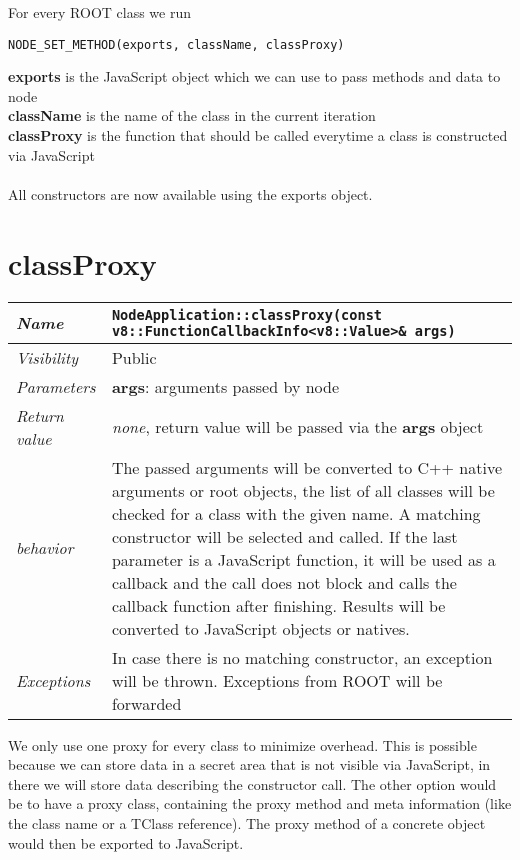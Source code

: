 For every ROOT class we run
\begin{verbatim}
NODE_SET_METHOD(exports, className, classProxy)
\end{verbatim}

\textbf{exports} is the JavaScript object which we can use to pass methods and data to node \\
\textbf{className} is the name of the class in the current iteration\\
\textbf{classProxy} is the function that should be called everytime a class is constructed via JavaScript\\
\\
All constructors are now available using the exports object.
\newpage
\section{classProxy}
\begin{longtable}{p{3cm} @{\hskip 1cm} p{12cm}}
  \hline
  \textit{Name} & \texttt{NodeApplication::classProxy(const v8::FunctionCallbackInfo<v8::Value>\& args)} \\
  \hline
  \textit{Visibility} & Public \\
  \hline
  \textit{Parameters} & \textbf{args}: arguments passed by node \\
  \hline
  \textit{Return value} & \textit{none}, return value will be passed via the \textbf{args} object \\
  \hline
  \textit{behavior} & The passed arguments will be converted to C++ native arguments or root objects, the list of all classes will be checked for a class with the given name. A matching constructor will be selected and called.
  If the last parameter is a JavaScript function, it will be used as a callback and the call does not block and calls the callback function after finishing.
  Results will be converted to JavaScript objects or natives. \\
  \hline
  \textit{Exceptions} & In case there is no matching constructor, an exception will be thrown.
  Exceptions from ROOT will be forwarded \\
  \hline
\end{longtable}
We only use one proxy for every class to minimize overhead. This is possible because we can store data in a secret area that is not visible via JavaScript, in there we will store data describing the constructor call.
The other option would be to have a proxy class, containing the proxy method and meta information (like the class name or a TClass reference).
The proxy method of a concrete object would then be exported to JavaScript.


